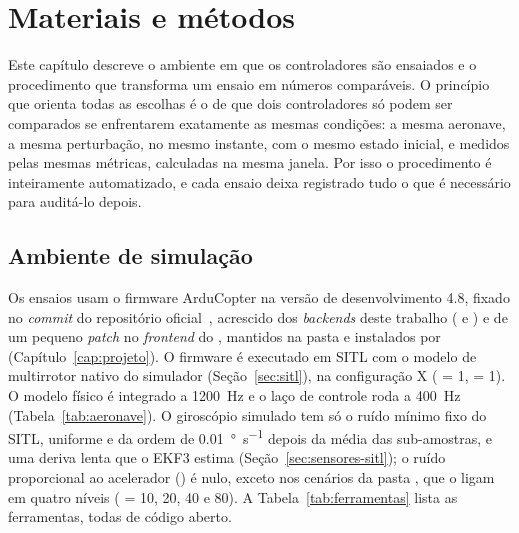 %
\chapter{Materiais e métodos}
\label{cap:metodos}

Este capítulo descreve o ambiente em que os controladores são ensaiados e o
procedimento que transforma um ensaio em números comparáveis. O princípio que
orienta todas as escolhas é o de que dois controladores só podem ser
comparados se enfrentarem exatamente as mesmas condições: a mesma aeronave, a
mesma perturbação, no mesmo instante, com o mesmo estado inicial, e medidos
pelas mesmas métricas, calculadas na mesma janela. Por isso o procedimento é
inteiramente automatizado, e cada ensaio deixa registrado tudo o que é
necessário para auditá-lo depois.

\section{Ambiente de simulação}
\label{sec:ambiente}

\begin{sloppypar}
Os ensaios usam o firmware ArduCopter na versão de desenvolvimento 4.8,
fixado no \textit{commit}  do repositório
oficial~\cite{ardupilot2026}, acrescido dos \textit{backends} deste trabalho
( e ) e de um
pequeno \textit{patch} no \textit{frontend} do ,
mantidos na pasta  e instalados por
 (Capítulo~\ref{cap:projeto}). O firmware é
executado em SITL com o modelo de multirrotor nativo do simulador
(Seção~\ref{sec:sitl}), na configuração X ( = 1,
 = 1). O modelo físico é integrado a \SI{1200}{\hertz} e
o laço de controle roda a \SI{400}{\hertz} (Tabela~\ref{tab:aeronave}). O
giroscópio simulado tem só o ruído mínimo fixo do SITL, uniforme e da ordem
de \SI{0.01}{\degree\per\second} depois da média das sub-amostras, e uma
deriva lenta que o EKF3 estima (Seção~\ref{sec:sensores-sitl}); o ruído
proporcional ao acelerador () é nulo, exceto nos
cenários da pasta , que o ligam em quatro níveis
( = 10, 20, 40 e 80). A Tabela~\ref{tab:ferramentas}
lista as ferramentas, todas de código aberto.
\end{sloppypar}

